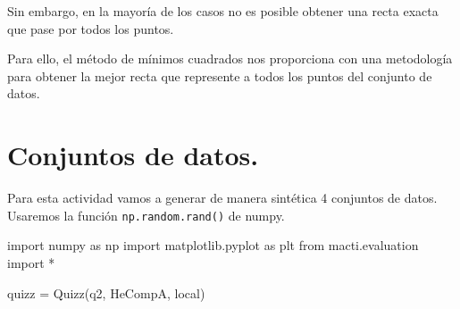 \documentclass[
  letterpaper,
  DIV=11,
  numbers=noendperiod]{scrreprt}
\newenvironment{Shaded}{\begin{snugshade}}{\end{snugshade}}
\newcommand{\ImportTok}[1]{\textcolor[rgb]{0.00,0.46,0.62}{#1}}
\newcommand{\NormalTok}[1]{\textcolor[rgb]{0.00,0.23,0.31}{#1}}
\newcommand{\OperatorTok}[1]{\textcolor[rgb]{0.37,0.37,0.37}{#1}}
\newcommand{\StringTok}[1]{\textcolor[rgb]{0.13,0.47,0.30}{#1}}
\begin{document}
Sin embargo, en la mayoría de los casos no es posible obtener una recta
exacta que pase por todos los puntos.

Para ello, el método de mínimos cuadrados nos proporciona con una
metodología para obtener la mejor recta que represente a todos los
puntos del conjunto de datos.


\chapter{Conjuntos de datos.}\label{conjuntos-de-datos.-1}

Para esta actividad vamos a generar de manera sintética 4 conjuntos de
datos. Usaremos la función \texttt{np.random.rand()} de numpy.

\begin{Shaded}
\begin{Highlighting}[]
\ImportTok{import}\NormalTok{ numpy }\ImportTok{as}\NormalTok{ np}
\ImportTok{import}\NormalTok{ matplotlib.pyplot }\ImportTok{as}\NormalTok{ plt}
\ImportTok{from}\NormalTok{ macti.evaluation }\ImportTok{import} \OperatorTok{*}
\end{Highlighting}
\end{Shaded}

\begin{Shaded}
\begin{Highlighting}[]
\NormalTok{quizz }\OperatorTok{=}\NormalTok{ Quizz(}\StringTok{\textquotesingle{}q2\textquotesingle{}}\NormalTok{, }\StringTok{\textquotesingle{}HeCompA\textquotesingle{}}\NormalTok{, }\StringTok{\textquotesingle{}local\textquotesingle{}}\NormalTok{)}
\end{Highlighting}
\end{Shaded}
\end{document}
